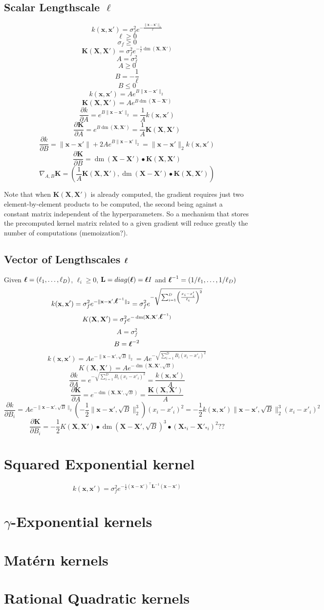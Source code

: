 \documentclass[a4paper,11pt]{article}
\newcommand\x{{\mathbf x}}
\newcommand\X{{\mathbf X}}
\newcommand\K{{\mathbf K}}
\newcommand\LL{{\mathbf L}}
\newcommand\ELL{{\Ivec \ell}}
\DeclareMathOperator*{\dm}{dm}
\newcommand{\Ivec}[1]{\mbox{\boldmath $#1$}}
\begin{document}
\subsection{Scalar Lengthscale $\ell$}
$$k(\x,\x') = \sigma_f^2 e^{-\frac{\|\x-\x'\|_2}{\ell}}$$
$$\ell \ge 0$$
$$\sigma_f \ge 0$$
$$\K(\X,\X') = \sigma_f^2 e^{-\frac{1}{\ell}\dm(\X,\X')}$$
$$A = \sigma_f^2$$
$$A \ge 0$$
$$B = -\frac{1}{\ell}$$
$$B \le 0$$
$$k(\x,\x') = A e^{B\|\x-\x'\|_2}$$
$$\K(\X,\X') = A e^{B \dm(\X-\X')}$$
$$\frac{\partial k}{\partial A} = e^{B\|\x-\x'\|_2} = \frac{1}{A}k(\x,\x')$$
$$\frac{\partial \K}{\partial A} = e^{B \dm(\X,\X')} = \frac{1}{A} \K(\X,\X')$$
$$\frac{\partial k}{\partial B} = \|\x-\x'\|+2 A e^{B\|\x-\x'\|_2} =
\|\x-\x'\|_2 k(\x,\x')$$
$$\frac{\partial \K}{\partial B} = \dm(\X-\X') \bullet \K(\X,\X')$$
$$\nabla_{A,B} \K = (\frac{1}{A} \K(\X,\X'), \dm(\X-\X') \bullet
\K(\X,\X'))$$

Note that when $\K(\X,\X')$ is already computed, the gradient requires
just two element-by-element products to be computed, the second being
against a constant matrix independent of the hyperparameters. So a
mechanism that stores the precomputed kernel matrix related to a given
gradient will reduce greatly the number of computations
(memoization?).

\subsection{Vector of Lengthscales $\Ivec{\ell}$}
Given $\Ivec{\ell} = (\ell_1,\ldots,\ell_D)$, $\ell_i \ge 0$, $\LL =
diag(\ELL) = \Ivec{\ell}I$ and $\ELL^{-1} =
(1/\ell_1,\ldots,1/\ell_D)$
$$k(\x,\x') = \sigma_f^2 e^{-\|\x-\x',\ELL^{-1}\|_2}= \sigma_f^2
  e^{-\sqrt{\sum_{i=1}^D \left(\frac{x_i - x'_i}{\ell_i}\right)^2}}$$
$$K(\X,\X') = \sigma_f^2 e^{-\dm(\X,\X',\ELL^{-1})}$$
$$A = \sigma_f^2$$
$$B = \ELL^{-2}$$
$$k(\x,\x') = A e^{-\|\x-\x',\sqrt{B}\|_2} = A e^{-\sqrt{\sum_{i=1}^D
    B_i(x_i - x'_i)^2}}$$  
$$K(\X,\X') = A e^{-\dm(\X,\X',\sqrt{B})}$$
$$\frac{\partial k}{\partial A} = e^{-\sqrt{\sum_{i=1}^D B_i(x_i -
    x'_i)^2}} = \frac{k(\x,\x')}{A}$$
$$\frac{\partial \K}{\partial A} = e^{-\dm(\X,\X',\sqrt{B})} =
\frac{\K(\X,\X')}{A}$$ 
$$\frac{\partial k}{\partial B_i} = A e^{-\|\x-\x',\sqrt{B}\|_2}
\left( -\frac{1}{2} \|\x-\x',\sqrt{B}\|_2^3 \right) (x_i - x'_i)^2 =
-\frac{1}{2} k(\x,\x') \|\x-\x',\sqrt{B}\|_2^3 (x_i - x'_i)^2 $$
$$\frac{\partial \K}{\partial B_i} = -\frac{1}{2} K(\X,\X')
\bullet \dm(\X-\X',\sqrt{B})^3 \bullet (\X_{*i} - \X'_{*i})^2??$$ 

\section{Squared Exponential kernel}
$$k(\x,\x') = \sigma_f^2 e^{-\frac{1}{2}(\x-\x')^{\top} \LL^{-1} (\x-\x')}$$

\section{$\gamma$-Exponential kernels}

\section{Mat\'ern kernels}

\section{Rational Quadratic kernels}
\end{document}
